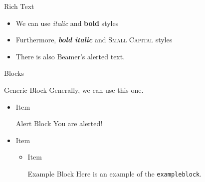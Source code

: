 \documentclass[14pt,t]{beamer}
\begin{document}
\begin{frame}{Rich Text}
  \begin{itemize}
  \item We can use \textit{italic} and \textbf{bold} styles
  \item Furthermore, \textit{\textbf{bold italic}} and \textsc{Small Capital} styles
  \item There is also Beamer's \alert{alerted text}.
  \end{itemize}
\end{frame}


\begin{frame}[fragile]{Blocks}
  \begin{block}{Generic Block}
    Generally, we can use this one.
  \end{block}

  \begin{itemize}
    \item Item
      \begin{alertblock}{Alert Block}
        You are alerted!
      \end{alertblock}
    \item Item
      \begin{itemize}
        \item Item
          \begin{exampleblock}{Example Block}
            Here is an example of the \verb|exampleblock|.
          \end{exampleblock}
      \end{itemize}
  \end{itemize}
\end{frame}
\end{document}
